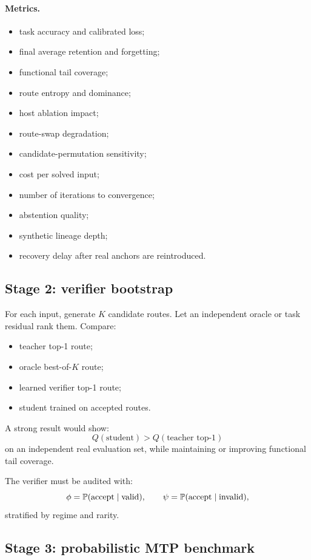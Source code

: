 \paragraph{Metrics.}
\begin{itemize}[leftmargin=*]
  \item task accuracy and calibrated loss;
  \item final average retention and forgetting;
  \item functional tail coverage;
  \item route entropy and dominance;
  \item host ablation impact;
  \item route-swap degradation;
  \item candidate-permutation sensitivity;
  \item cost per solved input;
  \item number of iterations to convergence;
  \item abstention quality;
  \item synthetic lineage depth;
  \item recovery delay after real anchors are reintroduced.
\end{itemize}

\subsection{Stage 2: verifier bootstrap}

For each input, generate $K$ candidate routes. Let an independent oracle or task residual rank them. Compare:

\begin{itemize}[leftmargin=*]
  \item teacher top-1 route;
  \item oracle best-of-$K$ route;
  \item learned verifier top-1 route;
  \item student trained on accepted routes.
\end{itemize}

A strong result would show:
\[
Q(\text{student}) > Q(\text{teacher top-1})
\]
on an independent real evaluation set, while maintaining or improving functional tail coverage.

The verifier must be audited with:
\[
\phi=\mathbb{P}(\text{accept}\mid\text{valid}),
\qquad
\psi=\mathbb{P}(\text{accept}\mid\text{invalid}),
\]
stratified by regime and rarity.

\subsection{Stage 3: probabilistic MTP benchmark}

